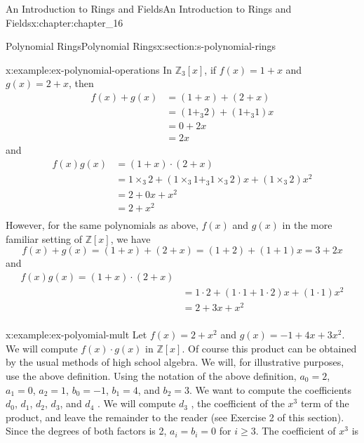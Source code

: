 \documentclass[twoside,10pt,]{book}
\numberwithin{equation}{section}
\begin{document}
\begin{chapterptx}{An Introduction to Rings and Fields}{}{An Introduction to Rings and Fields}{}{}{x:chapter:chapter_16}
\begin{sectionptx}{Polynomial Rings}{}{Polynomial Rings}{}{}{x:section:s-polynomial-rings}
\begin{example}{}{x:example:ex-polynomial-operations}%
In \(\mathbb{Z}_3[x]\), if \(f(x) = 1+x\) and  \(g(x) = 2+x\), then%
\begin{equation*}
\begin{split}
f(x) + g(x) &= (1+x) + (2+x)\\
& = \left(1 +_3 2\right)+ \left(1 +_3 1\right) x\\
&  = 0 + 2x  \\
& = 2x
\end{split}
\end{equation*}
and%
\begin{equation*}
\begin{split}
f(x)g(x) &= (1+x) \cdot  (2 +x) \\
&= 1\times_3 2+ (1 \times_3 1 +_3 1 \times_3 2)x +  (1 \times_3 2)x^2\\
& =2 + 0 x + x^2\\
& =2 +  x^2\\
\end{split}
\end{equation*}
However, for the same polynomials as above, \(f(x)\) and \(g(x)\) in the more familiar setting of \(\mathbb{Z}[x]\), we have%
\begin{equation*}
f(x) + g(x) = (1+x) + (2+x)  = (1 +2)+ (1 +1) x = 3 + 2x
\end{equation*}
and%
\begin{equation*}
\begin{split}f(x)g(x) =(1+x)\cdot(2 +x)\\
& = 1\cdot 2+ (1 \cdot 1 +  1 \cdot 2)x + (1 \cdot 1)x^2\\
& = 2 +3x + x^2\\
\end{split}
\end{equation*}
%
\end{example}
\begin{example}{}{x:example:ex-polyomial-mult}%
Let \(f(x) = 2 + x^2\) and \(g(x) = -1 + 4x + 3x^2\). We will compute \(f(x) \cdot  g(x)\) in \(\mathbb{Z}[x]\). Of course this product can be obtained by the usual methods of high school algebra. We will, for illustrative purposes, use the above definition. Using the notation of the above definition, \(a_0=2\), \(a_1=0\), \(a_2=1\), \(b_0=-1\), \(b_1= 4\), and \(b_2 = 3\). We want to compute the coefficients \(d_0\), \(d_1\), \(d_2\), \(d_3\), and \(d_4\) . We will compute \(d_3\) , the coefficient of the \(x^3\) term of the product, and leave the remainder to the reader (see Exercise 2 of this section).  Since the degrees of both factors is 2, \(a_i= b_i= 0\)  for \(i\geq 3\).  The coefficient of \(x^3\) is%

\end{example}
\end{sectionptx}
\end{chapterptx}
\end{document}
